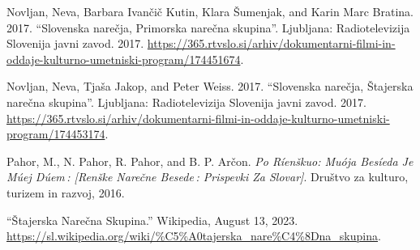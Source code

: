 \documentclass[fleqn,moreauthors,10pt]{ds_report}
\begin{document}
    Novljan, Neva, Barbara Ivančič Kutin, Klara Šumenjak, and Karin Marc Bratina. 2017. “Slovenska narečja, Primorska narečna skupina”. Ljubljana: Radiotelevizija Slovenija javni zavod. 2017. \href{https://365.rtvslo.si/arhiv/dokumentarni-filmi-in-oddaje-kulturno-umetniski-program/174451674}{https://365.rtvslo.si/arhiv/dokumentarni-filmi-in-oddaje-kulturno-umetniski-program/174451674}. 

    Novljan, Neva, Tjaša Jakop, and Peter Weiss. 2017. “Slovenska narečja, Štajerska narečna skupina”. Ljubljana: Radiotelevizija Slovenija javni zavod. 2017. \href{https://365.rtvslo.si/arhiv/dokumentarni-filmi-in-oddaje-kulturno-umetniski-program/174453174}{https://365.rtvslo.si/arhiv/dokumentarni-filmi-in-oddaje-kulturno-umetniski-program/174453174}.

    Pahor, M., N. Pahor, R. Pahor, and B. P. Arčon. \textit{Po Ríenškuo: Muója Besíeda Je Múej Dúem : [Renške Narečne Besede : Prispevki Za Slovar]}. Društvo za kulturo, turizem in razvoj, 2016.

    “Štajerska Narečna Skupina.” Wikipedia, August 13, 2023. \href{https://sl.wikipedia.org/wiki/\%C5\%A0tajerska_nare\%C4\%8Dna_skupina}{https://sl.wikipedia.org/wiki/\%C5\%A0tajerska\_nare\%C4\%8Dna\_skupina}. 
\end{document}
